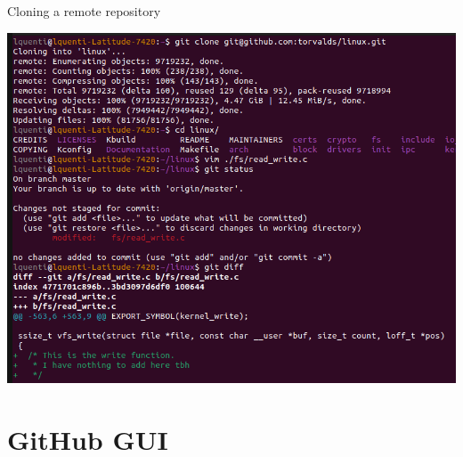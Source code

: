 \documentclass[compress,aspectratio=169]{beamer}
\begin{document}
  \begin{frame}[noframenumbering]{Cloning a remote repository}
    \begin{center}
      \includegraphics[height=0.85\textheight]{./assets/terminal_slideshows/04_clone_edit_05.png}
    \end{center}
  \end{frame}

  \section{GitHub GUI}
\end{document}
